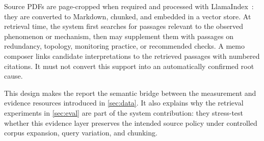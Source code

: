 Source PDFs are page-cropped when required and processed with LlamaIndex~\citep{liu2023llamaindex}: they are converted to Markdown, chunked, and embedded in a vector store. At retrieval time, the system first searches for passages relevant to the observed phenomenon or mechanism, then may supplement them with passages on redundancy, topology, monitoring practice, or recommended checks. A memo composer links candidate interpretations to the retrieved passages with numbered citations. It must not convert this support into an automatically confirmed root cause.

This design makes the report the semantic bridge between the measurement and evidence resources introduced in \cref{sec:data}. It also explains why the retrieval experiments in \cref{sec:eval} are part of the system contribution: they stress-test whether this evidence layer preserves the intended source policy under controlled corpus expansion, query variation, and chunking.
